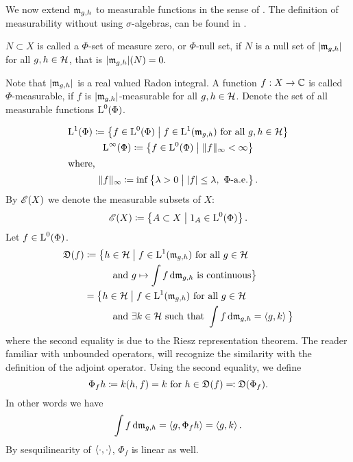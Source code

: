 % 
% 
We now extend $\mathfrak{m}_{g,h}$ to measurable functions in the sense of 
\cite[Ch. 4.5]{PedAnaN}.  The definition
 of measurability without using $\sigma$-algebras, can be found in
 \cite[Ch. 6.3]{PedAnaN}.
\begin{defi}
 $N \subset X$ is called a $\Phi$-set of measure zero, or $\Phi$-null set, if
 $N$ is a null set of $| \mathfrak{m}_{g,h}|$ for all $g,h \in \mathcal{H}$, that is  
  $| \mathfrak{m}_{g, h} | (N) =0.$
  
 Note that $| \mathfrak{m}_{g, h} |$ is a real valued Radon integral. 
 A function $f: X \to \mathbb{C}$ is called $\Phi$-measurable, if $f$ is 
 $|\mathfrak{m}_{g,h}|$-measurable for all $g,h \in \mathcal{H}$. 
 Denote the set of all measurable functions  ${\text{L}^0}(\Phi)$.
 

 \begin{gather*}
   {\text{L}^1}(\Phi) \coloneqq \left\lbrace f \in {\text{L}^0}(\Phi) \bigm | f \in \text{L}^1 (\mathfrak{m}_{g,h}) 
   \text{ for all }g,h \in \mathcal{H} \right\rbrace \\
   {\text{L}^\infty}(\Phi) \coloneqq \left\lbrace f \in {\text{L}^0}(\Phi) \bigm |  \|f \| _\infty 
   < \infty \right\rbrace\\
   \shortintertext{where, }
  \| f \| _\infty \coloneqq  \inf \left\lbrace \lambda > 0 \bigm |
    |f| \leq \lambda,  ~\Phi\text{-a.e.}\right\rbrace.
 \end{gather*}
  By $\mathscr{E}(X)$ we denote the measurable subsets of $X$:
 \[
 \mathscr{E}(X) \coloneqq \left\lbrace A \subset X \bigm | 1_A \in {\text{L}^0}(\Phi) \right\rbrace.
 \]
 Let $f \in {\text{L}^0}(\Phi)$.
 \begin{align*}
 \mathfrak{D}(f) &\coloneqq \big\lbrace h \in \mathcal{H} \bigm | f \in \text{L}^1  (\mathfrak{m}_{g,h})
 \text{ for all } g
 \in \mathcal{H}\\
 &~~~~~~~~\text{ and } g \mapsto \int f \operatorname{d}\! \mathfrak{m}_{g, h} \text{ is continuous} 
 \big\rbrace\\
 &=  \big\lbrace h \in \mathcal{H} \bigm | f \in \text{L}^1 (\mathfrak{m}_{g,h}) \text{ for all } g \in
 \mathcal{H} \\
 &~~~~~~~~\text{ and } \exists k \in \mathcal{H} \text{ such that } \int f \operatorname{d}\! \mathfrak{m}_{g,h}
 = \left\langle g, k \right\rangle \big\rbrace
 \end{align*}
where the second equality is due to the Riesz representation theorem. The 
reader familiar with unbounded operators, will recognize the similarity
with the definition of the adjoint operator.
Using the second equality, we define 
\[
\Phi_f h \coloneqq k(h, f) = k \text{ for } h \in \mathfrak{D}(f) \eqqcolon
\mathfrak{D}(\Phi_f).
\]
In other words we have 
\[
\int f \operatorname{d}\! \mathfrak{m}_{g,h} = \left\langle g, \Phi_f h \right\rangle = \left\langle g, k \right\rangle.
\]
By sesquilinearity of $\left\langle \cdot, \cdot \right\rangle$, $\Phi_f$ is linear as well.
\end{defi}


